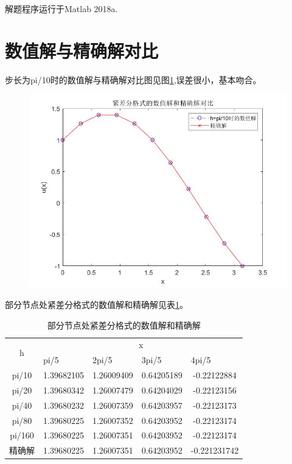 \documentclass[withoutpreface,bwprint]{cumcmthesis} %
\begin{document}
	解题程序运行于Matlab 2018a.
	\section{数值解与精确解对比}
	
	
	步长为pi/10时的数值解与精确解对比图见图\ref{fig:duibi},误差很小，基本吻合。
	\begin{figure}
		\centering
		\includegraphics[width=0.7\linewidth]{figures/duibi}
		\caption{}
		\label{fig:duibi}
	\end{figure}



	
	部分节点处紧差分格式的数值解和精确解见表\ref{tab:1}。
	
	\begin{table}[htbp]
		\centering
		\caption{部分节点处紧差分格式的数值解和精确解}
		\begin{tabular}{ccccc}
			\toprule[1.5pt]
			\multicolumn{1}{c}{\multirow{2}[0]{*}{h}} & \multicolumn{4}{c}{x} \\
			& \multicolumn{1}{l}{pi/5} & \multicolumn{1}{l}{2pi/5} & \multicolumn{1}{l}{3pi/5} & \multicolumn{1}{l}{4pi/5} \\
			\midrule[1pt]
			pi/10 & 1.39682105  & 1.26009409  & 0.64205189  & -0.22122884  \\
			pi/20 & 1.39680342  & 1.26007479  & 0.64204029  & -0.22123156  \\
			pi/40 & 1.39680232  & 1.26007359  & 0.64203957  & -0.22123173  \\
			pi/80 & 1.39680225  & 1.26007352  & 0.64203952  & -0.22123174  \\
			pi/160 & 1.39680225  & 1.26007351  & 0.64203952  & -0.22123174  \\
			精确解   & 1.39680225 & 1.26007351 & 0.64203952 & -0.221231742 \\
			\bottomrule[1.5pt]
		\end{tabular}%
		\label{tab:1}%
	\end{table}%
	
\end{document}
